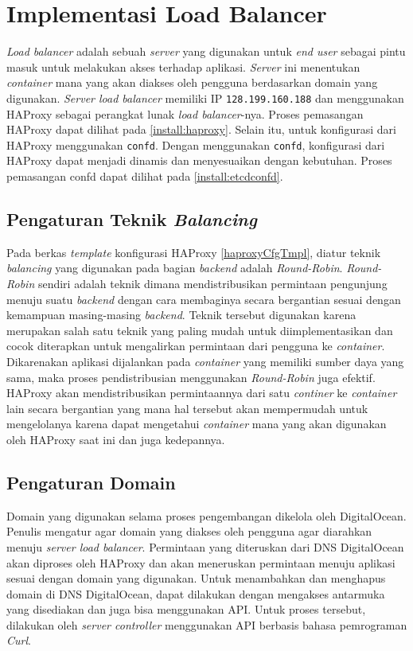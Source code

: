    \section{Implementasi Load Balancer}
    	\textit{Load balancer} adalah sebuah \textit{server} yang digunakan untuk \textit{end user} sebagai pintu masuk untuk melakukan akses terhadap aplikasi. \textit{Server} ini menentukan \textit{container} mana yang akan diakses oleh pengguna berdasarkan domain yang digunakan. \textit{Server load balancer} memiliki IP \texttt{128.199.160.188} dan menggunakan HAProxy sebagai perangkat lunak \textit{load balancer}-nya. Proses pemasangan HAProxy dapat dilihat pada \ref{install:haproxy}. Selain itu, untuk konfigurasi dari HAProxy menggunakan \texttt{confd}. Dengan menggunakan \texttt{confd}, konfigurasi dari HAProxy dapat menjadi dinamis dan menyesuaikan dengan kebutuhan. Proses pemasangan confd dapat dilihat pada \ref{install:etcdconfd}.
        
        \subsection{Pengaturan Teknik \textit{Balancing}}
        	Pada berkas \textit{template} konfigurasi HAProxy \ref{haproxyCfgTmpl}, diatur teknik \textit{balancing} yang digunakan pada bagian \textit{backend} adalah \textit{Round-Robin}. \textit{Round-Robin} sendiri adalah teknik dimana mendistribusikan permintaan pengunjung menuju suatu \textit{backend} dengan cara membaginya secara bergantian sesuai dengan kemampuan masing-masing \textit{backend}. Teknik tersebut digunakan karena merupakan salah satu teknik yang paling mudah untuk diimplementasikan dan cocok diterapkan untuk mengalirkan permintaan dari pengguna ke \textit{container}. Dikarenakan aplikasi dijalankan pada \textit{container} yang memiliki sumber daya yang sama, maka proses pendistribusian menggunakan \textit{Round-Robin} juga efektif. HAProxy akan mendistribusikan permintaannya dari satu \textit{continer} ke \textit{container} lain secara bergantian yang mana hal tersebut akan mempermudah untuk mengelolanya karena dapat mengetahui \textit{container} mana yang akan digunakan oleh HAProxy saat ini dan juga kedepannya.
        
        \subsection{Pengaturan Domain}
        	Domain yang digunakan selama proses pengembangan dikelola oleh DigitalOcean. Penulis mengatur agar domain yang diakses oleh pengguna agar diarahkan menuju \textit{server load balancer}. Permintaan yang diteruskan dari DNS DigitalOcean akan diproses oleh HAProxy dan akan meneruskan permintaan menuju aplikasi sesuai dengan domain yang digunakan. Untuk menambahkan dan menghapus domain di DNS DigitalOcean, dapat dilakukan dengan mengakses antarmuka yang disediakan dan juga bisa menggunakan API. Untuk proses tersebut, dilakukan oleh \textit{server controller} menggunakan API berbasis bahasa pemrograman \textit{Curl}.
        
